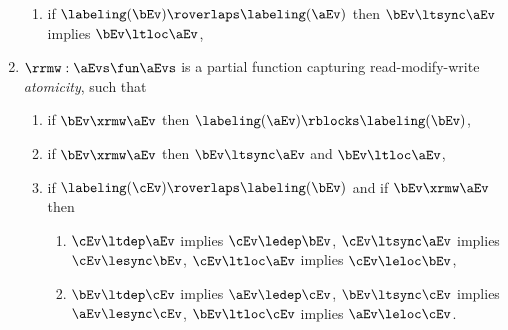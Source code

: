\begin{definition}
\begin{enumerate}[,label=(\textsc{m}\arabic*),ref=\textsc{m}\arabic*]
    \begin{enumerate}
    \item \label{pom-leloc-lesync}
      if $\labeling(\bEv)\roverlaps\labeling(\aEv)$ 
      then $\bEv\ltsync\aEv$ implies $\bEv\ltloc\aEv$,      
    \end{enumerate}
  \item \label{pom-rmw} 
    ${\rrmw} : \aEvs\fun\aEvs$ is a partial function capturing read-modify-write \emph{atomicity}, such that
    \begin{enumerate}
    \item \label{pom-rmw-block}
      if $\bEv\xrmw\aEv$ then $\labeling(\aEv) \rblocks \labeling(\bEv)$,
    \item \label{pom-rmw-lesync} \label{pom-rmw-leloc}
      if $\bEv\xrmw\aEv$ then $\bEv \ltsync \aEv$ and $\bEv \ltloc \aEv$,    
    \item \label{pom-rmw-atomic}
      if $\labeling(\cEv)\roverlaps\labeling(\bEv)$ and if $\bEv \xrmw \aEv$ then
      \begin{enumerate}        
      \item \label{pom-rmw-atomic1}
        $\cEv\ltdep \aEv$ implies $\cEv\ledep \bEv$,
        $\cEv\ltsync \aEv$ implies $\cEv\lesync \bEv$,
        $\cEv\ltloc \aEv$ implies $\cEv\leloc \bEv$,
      \item \label{pom-rmw-atomic2}
        $\bEv\ltdep \cEv$ implies $\aEv\ledep \cEv$,
        $\bEv\ltsync \cEv$ implies $\aEv\lesync \cEv$,
        $\bEv\ltloc \cEv$ implies $\aEv\leloc \cEv$.
      \end{enumerate}
    \end{enumerate}
  \end{enumerate}



\end{definition}
